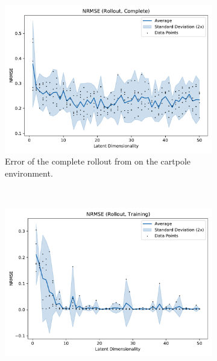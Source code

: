 			\begin{figure}
				\centering
				\begin{subfigure}{0.7\linewidth}
					\centering
					\includegraphics[width=\linewidth]{figures/results/cartpole-gym/latent-dim/comparison-rmse-rollout-normalized-mean-vs-latent-dim.pdf}
					\caption[Error of the complete rollout on the cartpole environment]{Error of the complete rollout from on the cartpole environment.}
					\label{fig:cartpoleRmseComplete}
				\end{subfigure} \\
				\begin{subfigure}{0.5\linewidth}
					\centering
					\includegraphics[width=\linewidth]{figures/results/cartpole-gym/latent-dim/comparison-rmse-rollout-train-normalized-mean-vs-latent-dim.pdf}

\end{subfigure}
\end{figure}
